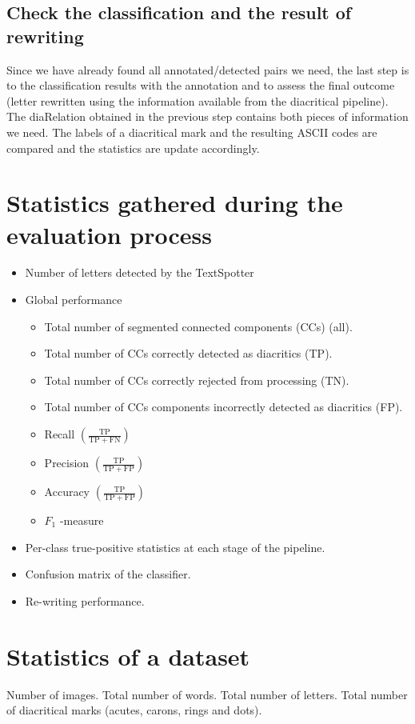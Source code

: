 \documentclass[12pt,a4paper]{report}
\begin{document}
\subsection{Check the classification and the result of rewriting}
Since we have already found all annotated/detected pairs we need, the last step is to the classification results with the annotation and to assess the final outcome (letter rewritten using the information available from the diacritical pipeline). The diaRelation obtained in the previous step contains both pieces of information we need. The labels of a diacritical mark and the resulting ASCII codes are compared and the statistics are update accordingly.

\section{Statistics gathered during the evaluation process}
\begin{itemize}
    \item Number of letters detected by the TextSpotter
    \item Global performance
    \begin{itemize}
        \item Total number of segmented connected components (CCs) (all).
        \item Total number of CCs correctly detected as diacritics (TP).
        \item Total number of CCs correctly rejected from processing (TN).
        \item Total number of CCs components incorrectly detected as diacritics (FP).
        \item Recall $\left(\frac{\mathrm{TP}}{\mathrm{TP} + \mathrm{FN}}\right)$
        \item Precision $\left(\frac{\mathrm{TP}}{\mathrm{TP} + \mathrm{FP}}\right)$
        \item Accuracy $\left(\frac{\mathrm{TP}}{\mathrm{TP} + \mathrm{FP}}\right)$
        \item $F_{1}$ -measure
    \end{itemize}
    \item Per-class true-positive statistics at each stage of the pipeline.
    \item Confusion matrix of the classifier.
    \item Re-writing performance.
\end{itemize}

\section{Statistics of a dataset}
Number of images. Total number of words. Total number of letters. Total number of diacritical marks (acutes, carons, rings and dots).
\end{document}
